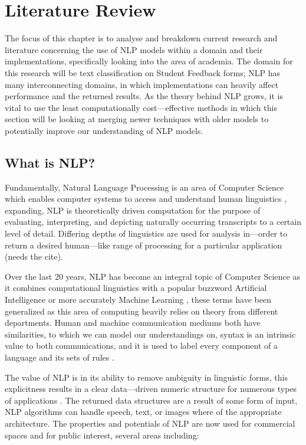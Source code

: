 \chapter{Literature Review}

The focus of this chapter is to analyse and breakdown current research and literature concerning the use of NLP models within a domain and their implementations, specifically looking into the area of academia. The domain for this research will be text classification on Student Feedback forms; NLP has many interconnecting domains, in which implementations can heavily affect performance and the returned results. As the theory behind NLP grows, it is vital to use the least computationally cost---effective methods in which this section will be looking at merging newer techniques with older models to potentially improve our understanding of NLP models.

\section{What is NLP?}

Fundamentally, Natural Language Processing is an area of Computer Science which enables computer systems to access and understand human linguistics \parencite{eisenstein2019introduction}, expanding, NLP is theoretically driven computation for the purpose of evaluating, interpreting, and depicting naturally occurring transcripts to a certain level of detail. Differing depths of linguistics are used for analysis in---order to return a desired human---like range of processing for a particular application (needs the cite).

Over the last 20 years, NLP has become an integral topic of Computer Science as it combines computational linguistics with a popular buzzword Artificial Intelligence or more accurately Machine Learning \parencite{ongsulee2017artificial}, these terms have been generalized as this area of computing heavily relies on theory from different departments. Human and machine communication mediums both have similarities, to which we can model our understandings on, syntax is an intrinsic value to both communications, and it is used to label every component of a language and its sets of rules \parencite{jain2018natural}.

The value of NLP is in its ability to remove ambiguity in linguistic forms, this explicitness results in a clear data---driven numeric structure for numerous types of applications \parencite{SAS2021NLP}. The returned data structures are a result of some form of input, NLP algorithms can handle speech, text, or images where of the appropriate architecture. The properties and potentials of NLP are now used for commercial spaces and for public interest, several areas including:

